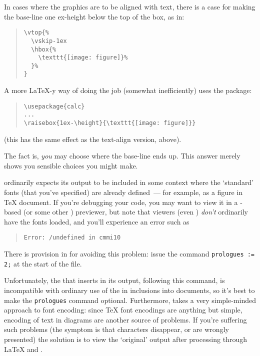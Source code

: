 In cases where the graphics are to be aligned with text, there is a
case for making the base-line one ex-height below the top of the box,
as in:
\begin{quote}
\begin{verbatim}
\vtop{%
  \vskip-1ex
  \hbox{%
    \texttt{[image: figure]}%
  }%
}
\end{verbatim}
\end{quote}
A more \LaTeX{}-y way of doing the job (somewhat inefficiently) uses
the  package:
\begin{quote}
\begin{verbatim}
\usepackage{calc}
...
\raisebox{1ex-\height}{\texttt{[image: figure]}}
\end{verbatim}
\end{quote}
(this has the same effect as the text-align version, above).

The fact is, \emph{you} may choose where the base-line ends up.  This
answer merely shows you sensible choices you might make.


\MP{} ordinarily expects its output to be included in some context
where the `standard' \MF{} fonts (that you've specified) are already
defined~--- for example, as a figure in \TeX{} document.  If you're
debugging your \MP{} code, you may want to view it in a
\href{http://www.ghostscript.com/}{}-based (or some
other \PS{}) previewer, but note that viewers (even
\href{http://www.ghostscript.com/}{})
\emph{don't} ordinarily have the fonts loaded, and you'll experience
an error such as
\begin{quote}
\begin{verbatim}
Error: /undefined in cmmi10
\end{verbatim}
\end{quote}
There is provision in \MP{} for avoiding this problem: issue the
command \texttt{prologues := 2;} at the start of the  file.

Unfortunately, the \PS{} that \MP{} inserts in its output,
following this command, is incompatible with ordinary use of the
\PS{} in inclusions into \AllTeX{} documents, so it's best to
make the \texttt{prologues} command optional.  Furthermore, \MP{} takes a
very simple-minded approach to font encoding: since \TeX{} font
encodings are anything but simple, encoding of text in diagrams are
another source of problems.  If you're suffering such problems (the
symptom is that 
characters disappear, or are wrongly presented) the solution is
to view the `original' \MP{} output after processing through
\LaTeX{} and .

